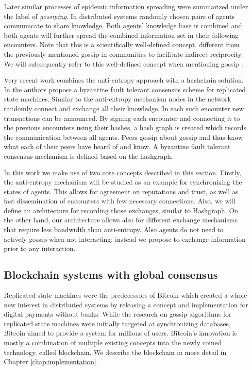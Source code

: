 Later similar processes of epidemic information spreading were summarized under the label of 
\textit{gossiping}. In distributed systems randomly chosen pairs of agents communicate to share 
knowledge. Both agents' knowledge base is combined and both agents will further spread the combined
information set in their following encounters. Note that this is a scientifically well-defined 
concept. different from the previously mentioned gossip in communities to facilitate indirect reciprocity.
We will subsequently refer to this well-defined concept when mentioning gossip \cite{hedetniemi1988survey}.

Very recent work combines the anti-entropy approach with a hashchain solution. In \cite{baird2016swirlds}
the authors propose a byzantine fault tolerant consensus scheme for replicated state machines. Similar
to the anti-entropy mechanism nodes in the network randomly connect and exchange all their knowledge. In each
such encounter new transactions can be announced. By signing each encounter and connecting it to the
previous encounters using their hashes, a hash graph is created which records the communication 
between all agents. Peers gossip about gossip and thus know what each of their peers have heard of and
know. A byzantine fault tolerant consensus mechanism is defined based on the hashgraph.

In this work we make use of two core concepts described in this section. Firstly, the anti-entropy
mechanism will be studied as an example for synchronizing the states of agents. This allows for 
agreement on reputations and trust, as well as fast dissemination of encounters with few necessary
connections. Also, we will define an architecture for recording those exchanges, similar to Hashgraph.
On the other hand, our architecture allows also for different exchange mechanisms that require less
bandwidth than anti-entropy. Also agents do not need to actively gossip when not interacting: instead
we propose to exchange information prior to any interaction.

\subsection{Blockchain systems with global consensus}
Replicated state machines were the predecessors of Bitcoin\cite{nakamoto2008bitcoin} which created 
a whole new interest in distributed systems by releasing a concept and implementation for digital payments 
without banks. While the research on gossip algorithms for replicated state machines were initially
targeted at synchronizing databases, Bitcoin aimed to provide a system for millions of users. Bitcoin's
innovation is mostly a combination of
multiple existing concepts into the newly coined technology, called blockchain. We describe the 
blockchain in more detail in Chapter \ref{chap:implementation}.

